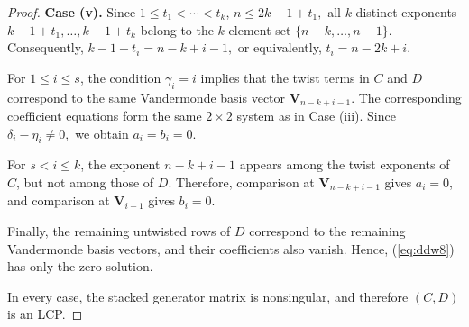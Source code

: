 \documentclass[10pt,a4paper]{amsart}
\begin{document}
\begin{proof}
\medskip
\noindent\textbf{Case (v).}
Since
\(
1\le t_1<\cdots<t_k
\),
\(
n\le 2k-1+t_1,
\)
all \(k\) distinct exponents
\(
k-1+t_1,\ldots,k-1+t_k
\)
belong to the \(k\)-element set
\(
\{n-k,\ldots,n-1\}.
\)
Consequently,
\(
k-1+t_i=n-k+i-1,
\)
or equivalently,
\(
t_i=n-2k+i.
\)

For \(1\le i\le s\), the condition \(\gamma_i=i\) implies that the twist terms in \(C\) and \(D\) correspond to the same Vandermonde basis vector \(\mathbf{V}_{n-k+i-1}\). The corresponding coefficient equations form the same \(2\times2\) system as in Case (iii). Since
\(
\delta_i-\eta_i\ne0,
\) we obtain
\(
a_i=b_i=0.
\)

For \(s<i\le k\), the exponent \(n-k+i-1\) appears among the twist exponents of \(C\), but not among those of \(D\). Therefore, comparison at \(\mathbf{V}_{n-k+i-1}\) gives \(a_i=0\), and comparison at \(\mathbf{V}_{i-1}\) gives \(b_i=0\).

Finally, the remaining untwisted rows of \(D\) correspond to the remaining Vandermonde basis vectors, and their coefficients also vanish. Hence, (\ref{eq:ddw8}) has only the zero solution.

In every case, the stacked generator matrix is nonsingular, and therefore \((C,D)\) is an LCP.
\end{proof}
\end{document}
